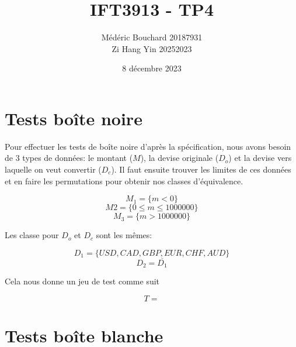 \documentclass{article}
\author{Médéric Bouchard 20187931\\
Zi Hang Yin 20252023}
\date{8 décembre 2023}
\title{IFT3913 - TP4}
\begin{document}
\maketitle

\section{Tests boîte noire}

Pour effectuer les tests de boîte noire d'après la spécification, nous avons besoin de 3 types de données: le montant ($M$), la devise originale ($D_o$) et la devise vers laquelle on veut convertir ($D_c$).
Il faut ensuite trouver les limites de ces données et en faire les permutations pour obtenir nos classes d'équivalence.

$$M_1 = \{m < 0\}$$
$$M2 = \{0 \leq m \leq 1 000 000\}$$
$$M_3 = \{m > 1 000 000\}$$

Les classe pour $D_o$ et $D_c$ sont les mêmes:

$$D_1 = \{USD, CAD, GBP, EUR, CHF, AUD\}$$
$$D_2 = \overline{D_1}$$

Cela nous donne un jeu de test comme suit

$$T = $$

\section{Tests boîte blanche}
\end{document}
